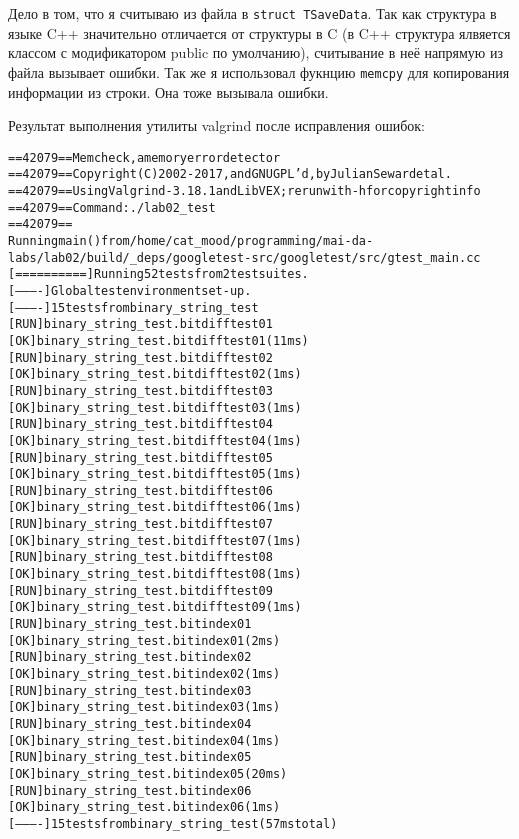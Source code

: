 Дело в том, что я считываю из файла в {\tt struct TSaveData}. Так как структура в языке C++ значительно отличается от
структуры в C (в C++ структура ялвяется классом с модификатором public по умолчанию), считывание в неё напрямую из файла
вызывает ошибки. Так же я использовал фукнцию {\tt memcpy} для копирования информации из строки. Она тоже вызывала ошибки.

Результат выполнения утилиты valgrind после исправления ошибок:

\begin{alltt}
==42079== Memcheck, a memory error detector
==42079== Copyright (C) 2002-2017, and GNU GPL'd, by Julian Seward et al.
==42079== Using Valgrind-3.18.1 and LibVEX; rerun with -h for copyright info
==42079== Command: ./lab02_test
==42079== 
Running main() from /home/cat_mood/programming/mai-da-labs/lab02/build/_deps/googletest-src/googletest/src/gtest_main.cc
[==========] Running 52 tests from 2 test suites.
[----------] Global test environment set-up.
[----------] 15 tests from binary_string_test
[ RUN      ] binary_string_test.bitdifftest01
[       OK ] binary_string_test.bitdifftest01 (11 ms)
[ RUN      ] binary_string_test.bitdifftest02
[       OK ] binary_string_test.bitdifftest02 (1 ms)
[ RUN      ] binary_string_test.bitdifftest03
[       OK ] binary_string_test.bitdifftest03 (1 ms)
[ RUN      ] binary_string_test.bitdifftest04
[       OK ] binary_string_test.bitdifftest04 (1 ms)
[ RUN      ] binary_string_test.bitdifftest05
[       OK ] binary_string_test.bitdifftest05 (1 ms)
[ RUN      ] binary_string_test.bitdifftest06
[       OK ] binary_string_test.bitdifftest06 (1 ms)
[ RUN      ] binary_string_test.bitdifftest07
[       OK ] binary_string_test.bitdifftest07 (1 ms)
[ RUN      ] binary_string_test.bitdifftest08
[       OK ] binary_string_test.bitdifftest08 (1 ms)
[ RUN      ] binary_string_test.bitdifftest09
[       OK ] binary_string_test.bitdifftest09 (1 ms)
[ RUN      ] binary_string_test.bitindex01
[       OK ] binary_string_test.bitindex01 (2 ms)
[ RUN      ] binary_string_test.bitindex02
[       OK ] binary_string_test.bitindex02 (1 ms)
[ RUN      ] binary_string_test.bitindex03
[       OK ] binary_string_test.bitindex03 (1 ms)
[ RUN      ] binary_string_test.bitindex04
[       OK ] binary_string_test.bitindex04 (1 ms)
[ RUN      ] binary_string_test.bitindex05
[       OK ] binary_string_test.bitindex05 (20 ms)
[ RUN      ] binary_string_test.bitindex06
[       OK ] binary_string_test.bitindex06 (1 ms)
[----------] 15 tests from binary_string_test (57 ms total)


\end{alltt}
